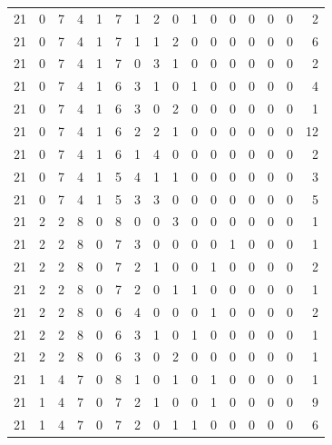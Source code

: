 \begin{appendix}
{\begin{longtable}{lrrrrrrrrrrrrrrr}
    21        & 0  & 7  & 4  & 1  & 7  & 1  & 2  & 0  & 1  & 0  & 0  & 0   & 0   & 0   & 2    \\
    21        & 0  & 7  & 4  & 1  & 7  & 1  & 1  & 2  & 0  & 0  & 0  & 0   & 0   & 0   & 6    \\
    21        & 0  & 7  & 4  & 1  & 7  & 0  & 3  & 1  & 0  & 0  & 0  & 0   & 0   & 0   & 2    \\
    21        & 0  & 7  & 4  & 1  & 6  & 3  & 1  & 0  & 1  & 0  & 0  & 0   & 0   & 0   & 4    \\
    21        & 0  & 7  & 4  & 1  & 6  & 3  & 0  & 2  & 0  & 0  & 0  & 0   & 0   & 0   & 1    \\
    21        & 0  & 7  & 4  & 1  & 6  & 2  & 2  & 1  & 0  & 0  & 0  & 0   & 0   & 0   & 12   \\
    21        & 0  & 7  & 4  & 1  & 6  & 1  & 4  & 0  & 0  & 0  & 0  & 0   & 0   & 0   & 2    \\
    21        & 0  & 7  & 4  & 1  & 5  & 4  & 1  & 1  & 0  & 0  & 0  & 0   & 0   & 0   & 3    \\
    21        & 0  & 7  & 4  & 1  & 5  & 3  & 3  & 0  & 0  & 0  & 0  & 0   & 0   & 0   & 5    \\
    21        & 2  & 2  & 8  & 0  & 8  & 0  & 0  & 3  & 0  & 0  & 0  & 0   & 0   & 0   & 1    \\
    21        & 2  & 2  & 8  & 0  & 7  & 3  & 0  & 0  & 0  & 0  & 1  & 0   & 0   & 0   & 1    \\
    21        & 2  & 2  & 8  & 0  & 7  & 2  & 1  & 0  & 0  & 1  & 0  & 0   & 0   & 0   & 2    \\
    21        & 2  & 2  & 8  & 0  & 7  & 2  & 0  & 1  & 1  & 0  & 0  & 0   & 0   & 0   & 1    \\
    21        & 2  & 2  & 8  & 0  & 6  & 4  & 0  & 0  & 0  & 1  & 0  & 0   & 0   & 0   & 2    \\
    21        & 2  & 2  & 8  & 0  & 6  & 3  & 1  & 0  & 1  & 0  & 0  & 0   & 0   & 0   & 1    \\
    21        & 2  & 2  & 8  & 0  & 6  & 3  & 0  & 2  & 0  & 0  & 0  & 0   & 0   & 0   & 1    \\
    21        & 1  & 4  & 7  & 0  & 8  & 1  & 0  & 1  & 0  & 1  & 0  & 0   & 0   & 0   & 1    \\
    21        & 1  & 4  & 7  & 0  & 7  & 2  & 1  & 0  & 0  & 1  & 0  & 0   & 0   & 0   & 9    \\
    21        & 1  & 4  & 7  & 0  & 7  & 2  & 0  & 1  & 1  & 0  & 0  & 0   & 0   & 0   & 6    \\

\end{longtable}}
\end{appendix}
